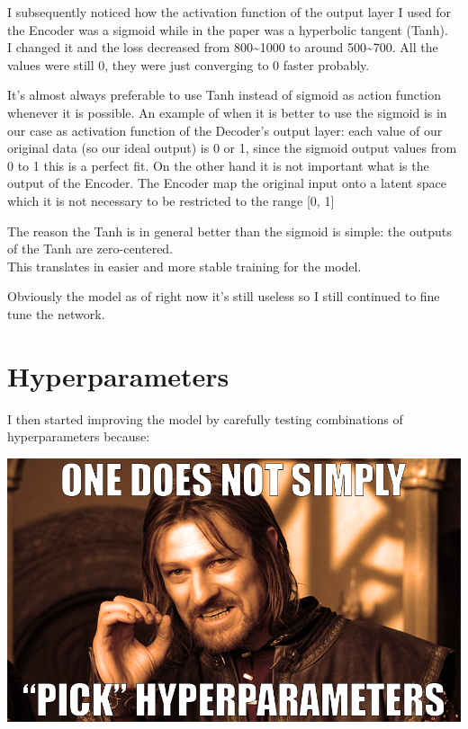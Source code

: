 \documentclass[
  letterpaper,
  DIV=11,
  numbers=noendperiod]{scrreprt}
\begin{document}
I subsequently noticed how the activation function of the output layer I
used for the Encoder was a sigmoid while in the paper was a hyperbolic
tangent (Tanh).\\
I changed it and the loss decreased from 800\textasciitilde1000 to
around 500\textasciitilde700. All the values were still 0, they were
just converging to 0 faster probably.

It's almost always preferable to use Tanh instead of sigmoid as action
function whenever it is possible. An example of when it is better to use
the sigmoid is in our case as activation function of the Decoder's
output layer: each value of our original data (so our ideal output) is 0
or 1, since the sigmoid output values from 0 to 1 this is a perfect fit.
On the other hand it is not important what is the output of the Encoder.
The Encoder map the original input onto a latent space which it is not
necessary to be restricted to the range {[}0, 1{]}

The reason the Tanh is in general better than the sigmoid is simple: the
outputs of the Tanh are zero-centered.\\
This translates in easier and more stable training for the model.

Obviously the model as of right now it's still useless so I still
continued to fine tune the network.

\hypertarget{hyperparameters}{%
\chapter{Hyperparameters}\label{hyperparameters}}

I then started improving the model by carefully testing combinations of
hyperparameters because:

\includegraphics{pick_hyperparameters.png}
\end{document}
